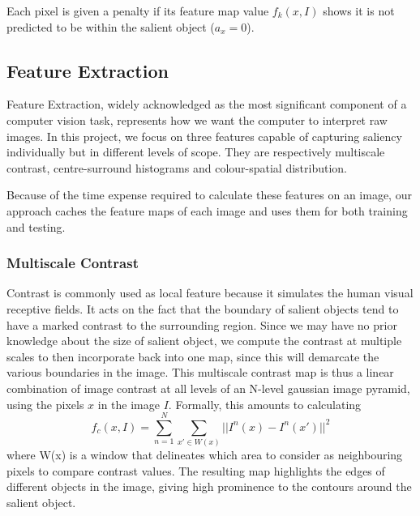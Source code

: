 \documentclass[10pt,twocolumn,letterpaper]{article}
\newcommand{\SUM}{\sum\limits}
\newcommand{\BOLD}{\textbf}
\begin{document}
Each pixel is given a penalty if its feature map value $f_k(x,I)$ shows it is not predicted to be within the salient object ($a_x = 0$).


\subsection{Feature Extraction}
Feature Extraction, widely acknowledged as the most significant component of a computer vision task, represents how we want the computer to interpret raw images. In this project, we focus on three features capable of capturing saliency individually but in different levels of scope. They are respectively multiscale contrast, centre-surround histograms  and colour-spatial distribution.

Because of the time expense required to calculate these features on an image, our approach caches the feature maps of each image and uses them for both training and testing.
\subsubsection{Multiscale Contrast}

Contrast is commonly used as local feature because it simulates the human visual receptive fields. It acts on the fact that the boundary of salient objects tend to have a marked contrast to the surrounding region. Since we may have no prior knowledge about the size of salient object, we compute the contrast at multiple scales to then incorporate back into one map, since this will demarcate the various boundaries in the image.  This multiscale contrast map is thus a linear combination of image contrast at all levels of an N-level gaussian image pyramid, using the pixels $x$ in the image $I$.  Formally, this amounts to calculating $$f_c(x,I) = \SUM_{n = 1}^{N}\SUM_{x'\in W(x)}||I^n(x)-I^n(x')||^2$$ where W(x) is a window that delineates which area to consider as neighbouring pixels to compare contrast values.  The resulting map highlights the edges of different objects in the image, giving high prominence to the contours around the salient object.

\end{document}
